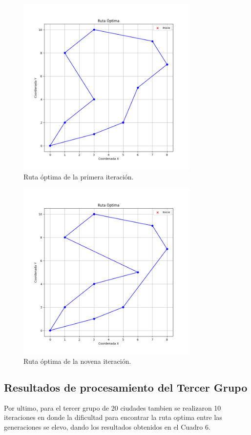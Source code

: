 \documentclass{article}
\begin{document}
\begin{figure}[h]
\centering
\includegraphics[width=9cm]{img/101Ruta.png}
\caption{Ruta óptima de la primera iteración.}
\label{fig:etiqueta5}
\end{figure}

\begin{figure}[h]
  \centering
  \includegraphics[width=9cm]{img/109Ruta.png}
  \caption{Ruta óptima de la novena iteración.}
  \label{fig:etiqueta6}
\end{figure}

\clearpage
\subsection{Resultados de procesamiento del Tercer Grupo}

Por ultimo, para el tercer grupo de 20 ciudades tambien se realizaron 10 iteraciones en donde la dificultad para encontrar la ruta optima entre las generaciones se elevo, dando los resultados obtenidos en el Cuadro 6.\\
\end{document}
